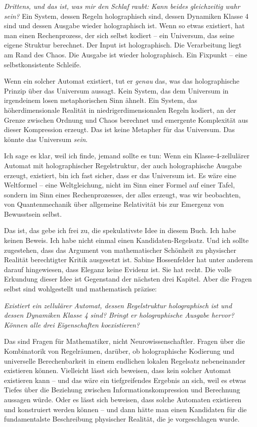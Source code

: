 \documentclass[11pt, twoside, openright]{book}
\begin{document}
\textit{Drittens, und das ist, was mir den Schlaf raubt: Kann beides gleichzeitig wahr sein?} Ein System, dessen Regeln holographisch sind, dessen Dynamiken Klasse 4 sind und dessen Ausgabe wieder holographisch ist. Wenn so etwas existiert, hat man einen Rechenprozess, der sich selbst kodiert -- ein Universum, das seine eigene Struktur berechnet. Der Input ist holographisch. Die Verarbeitung liegt am Rand des Chaos. Die Ausgabe ist wieder holographisch. Ein Fixpunkt -- eine selbstkonsistente Schleife.

Wenn ein solcher Automat existiert, tut er \textit{genau} das, was das holographische Prinzip über das Universum aussagt. Kein System, das dem Universum in irgendeinem losen metaphorischen Sinn ähnelt. Ein System, das höherdimensionale Realität in niedrigerdimensionalen Regeln kodiert, an der Grenze zwischen Ordnung und Chaos berechnet und emergente Komplexität aus dieser Kompression erzeugt. Das ist keine Metapher für das Universum. Das könnte das Universum \textit{sein}.

Ich sage es klar, weil ich finde, jemand sollte es tun: Wenn ein Klasse-4-zellulärer Automat mit holographischer Regelstruktur, der auch holographische Ausgabe erzeugt, existiert, bin ich fast sicher, dass er das Universum ist. Es wäre eine Weltformel -- eine Weltgleichung, nicht im Sinn einer Formel auf einer Tafel, sondern im Sinn eines Rechenprozesses, der alles erzeugt, was wir beobachten, von Quantenmechanik über allgemeine Relativität bis zur Emergenz von Bewusstsein selbst.

Das ist, das gebe ich frei zu, die spekulativste Idee in diesem Buch. Ich habe keinen Beweis. Ich habe nicht einmal einen Kandidaten-Regelsatz. Und ich sollte zugestehen, dass das Argument von mathematischer Schönheit zu physischer Realität berechtigter Kritik ausgesetzt ist. Sabine Hossenfelder hat unter anderem darauf hingewiesen, dass Eleganz keine Evidenz ist. Sie hat recht. Die volle Erkundung dieser Idee ist Gegenstand der nächsten drei Kapitel. Aber die Fragen selbst sind wohlgestellt und mathematisch präzise:

\textit{Existiert ein zellulärer Automat, dessen Regelstruktur holographisch ist und dessen Dynamiken Klasse 4 sind? Bringt er holographische Ausgabe hervor? Können alle drei Eigenschaften koexistieren?}

Das sind Fragen für Mathematiker, nicht Neurowissenschaftler. Fragen über die Kombinatorik von Regelräumen, darüber, ob holographische Kodierung und universelle Berechenbarkeit in einem endlichen lokalen Regelsatz nebeneinander existieren können. Vielleicht lässt sich beweisen, dass kein solcher Automat existieren kann -- und das wäre ein tiefgreifendes Ergebnis an sich, weil es etwas Tiefes über die Beziehung zwischen Informationskompression und Berechnung aussagen würde. Oder es lässt sich beweisen, dass solche Automaten existieren und konstruiert werden können -- und dann hätte man einen Kandidaten für die fundamentalste Beschreibung physischer Realität, die je vorgeschlagen wurde.
\end{document}
